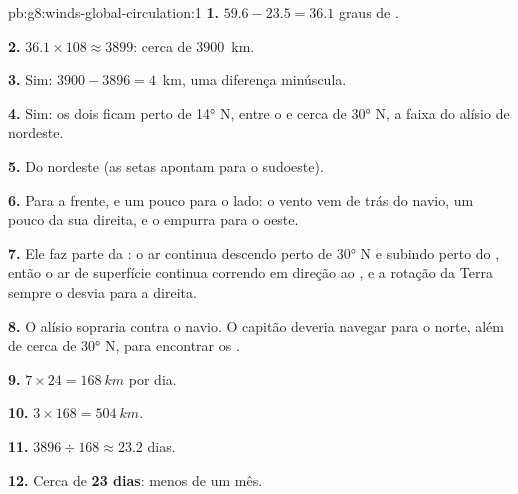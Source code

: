\begin{solution}{pb:g8:winds-global-circulation:1}
\textbf{1.} $59.6 - 23.5 = 36.1$ graus de .

\textbf{2.} $36.1 \times 108 \approx 3899$: cerca de \qty{3900}{km}.

\textbf{3.} Sim: $3900 - 3896 = 4$~km, uma diferença minúscula.

\textbf{4.} Sim: os dois ficam perto de \ang{14} N, entre o  e
cerca de \ang{30} N, a faixa do alísio de nordeste.

\textbf{5.} Do nordeste (as setas apontam para o sudoeste).

\textbf{6.} Para a frente, e um pouco para o lado: o vento vem de trás do
navio, um pouco da sua direita, e o empurra para o oeste.

\textbf{7.} Ele faz parte da : o ar continua descendo
perto de \ang{30} N e subindo perto do , então o ar de superfície
continua correndo em direção ao , e a rotação da Terra sempre o
desvia para a direita.

\textbf{8.} O alísio sopraria contra o navio. O capitão deveria navegar
para o norte, além de cerca de \ang{30} N, para encontrar os .

\textbf{9.} $7 \times 24 = \qty{168}{km}$ por dia.

\textbf{10.} $3 \times 168 = \qty{504}{km}$.

\textbf{11.} $3896 \div 168 \approx 23.2$ dias.

\textbf{12.} Cerca de \textbf{23 dias}: menos de um mês.
\end{solution}
